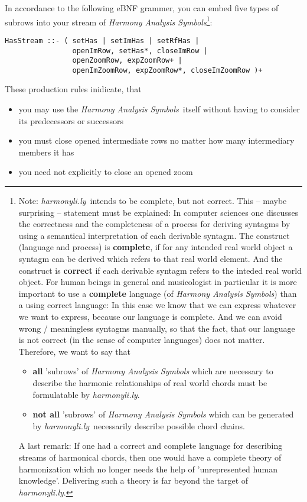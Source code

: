 \documentclass[
  DIV=calc,
  BCOR=5mm,
  12pt,
  headings=small,
  oneside,
  abstract=true,
  toc=bib,
  xcolor=dvipsnames,
  openany,
  ngerman,english]{scrartcl}
\newcommand{\hlyn}[0]{\textit{harmonyli.ly}}
\newcommand{\has}[1]{\textit{Harmony Analysis Symbol#1}}
\begin{document}
In accordance to the following eBNF grammer, you can embed five types of subrows
into your stream of \has{s}\footnote{Note: \hlyn\ intends to be complete, but
not correct. This -- maybe surprising -- statement must be explained: In
computer sciences one discusses the correctness and the completeness of a
process for deriving syntagms by using a semantical interpretation of each
derivable syntagm. The construct (language and process) is \textbf{complete}, if
for any intended real world object a syntagm can be derived which refers to that
real world element. And the construct is \textbf{correct} if each derivable
syntagm refers to the inteded real world object. For human beings in general and
musicologist in particular it is more important to use a \textbf{complete} 
language (of \has{s}) than a using correct language: In this case we know that
we can express whatever we want to express, because our language is complete.
And we can avoid wrong / meaningless syntagms manually, so that the fact, that
our language is not correct (in the sense of computer languages) does not
matter. Therefore, we want to say that
\begin{itemize}
  \item \textbf{all} 'subrows' of \has{s} which are necessary to describe the
  harmonic relationships of real world chords must be formulatable by \hlyn.
  \item \textbf{not all} 'subrows' of \has{s} which can be generated by \hlyn\
  necessarily describe possible chord chains.
\end{itemize}
A last remark: If one had a correct and complete language for describing streams
of harmonical chords, then one would have a complete theory of harmonization
which no longer needs the help of 'unrepresented human knowledge'.
Delivering such a theory is far beyond the target of \hlyn.
}:

\begin{verbatim}
HasStream ::- ( setHas | setImHas | setRfHas |
                openImRow, setHas*, closeImRow |
                openZoomRow, expZoomRow+ |
                openImZoomRow, expZoomRow*, closeImZoomRow )+
\end{verbatim}

These production rules inidicate, that 
\begin{itemize}
  \item you may use the \has{s}\ itself without having to consider its
  predecessors or successors
  \item you must close opened intermediate rows no matter how many intermediary
  members it has
  \item you need not explicitly to close an opened zoom
\end{itemize}
\end{document}
